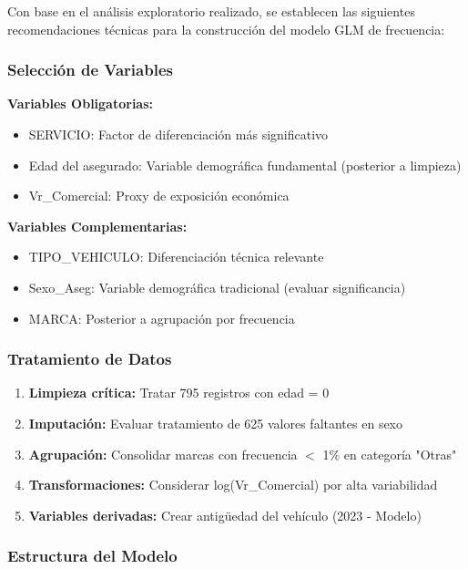 Con base en el análisis exploratorio realizado, se establecen las siguientes recomendaciones técnicas para la construcción del modelo GLM de frecuencia:

\subsubsection{Selección de Variables}

\textbf{Variables Obligatorias:}
\begin{itemize}
\item SERVICIO: Factor de diferenciación más significativo
\item Edad del asegurado: Variable demográfica fundamental (posterior a limpieza)
\item Vr\_Comercial: Proxy de exposición económica
\end{itemize}

\textbf{Variables Complementarias:}
\begin{itemize}
\item TIPO\_VEHICULO: Diferenciación técnica relevante
\item Sexo\_Aseg: Variable demográfica tradicional (evaluar significancia)
\item MARCA: Posterior a agrupación por frecuencia
\end{itemize}

\subsubsection{Tratamiento de Datos}

\begin{enumerate}
\item \textbf{Limpieza crítica:} Tratar 795 registros con edad = 0
\item \textbf{Imputación:} Evaluar tratamiento de 625 valores faltantes en sexo
\item \textbf{Agrupación:} Consolidar marcas con frecuencia $<$ 1\% en categoría "Otras"
\item \textbf{Transformaciones:} Considerar log(Vr\_Comercial) por alta variabilidad
\item \textbf{Variables derivadas:} Crear antigüedad del vehículo (2023 - Modelo)
\end{enumerate}

\subsubsection{Estructura del Modelo}

